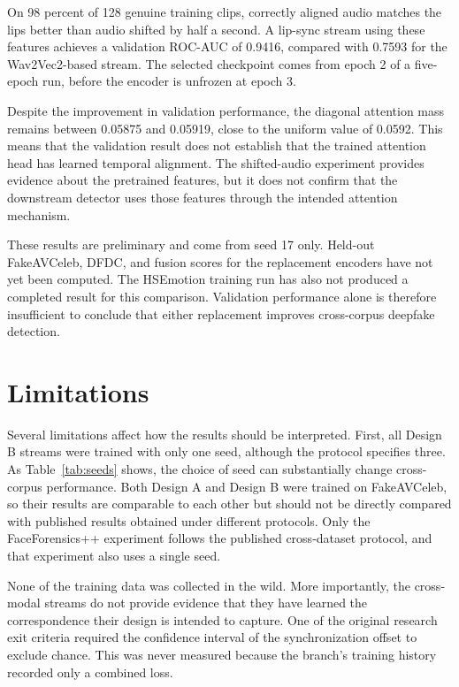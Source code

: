 \documentclass[conference]{IEEEtran}
\begin{document}
On 98 percent of 128 genuine training clips, correctly aligned audio matches
the lips better than audio shifted by half a second. A lip-sync stream using
these features achieves a validation ROC-AUC of 0.9416, compared with
0.7593 for the Wav2Vec2-based stream. The selected checkpoint comes from
epoch 2 of a five-epoch run, before the encoder is unfrozen at epoch 3.

Despite the improvement in validation performance, the diagonal attention
mass remains between 0.05875 and 0.05919, close to the uniform value of
0.0592. This means that the validation result does not establish that the
trained attention head has learned temporal alignment. The shifted-audio
experiment provides evidence about the pretrained features, but it does not
confirm that the downstream detector uses those features through the intended
attention mechanism.

These results are preliminary and come from seed 17 only. Held-out
FakeAVCeleb, DFDC, and fusion scores for the replacement encoders have not
yet been computed. The HSEmotion training run has also not produced a
completed result for this comparison. Validation performance alone is
therefore insufficient to conclude that either replacement improves
cross-corpus deepfake detection.

\section{Limitations}

Several limitations affect how the results should be interpreted. First,
all Design B streams were trained with only one seed, although the protocol
specifies three. As Table~\ref{tab:seeds} shows, the choice of seed can
substantially change cross-corpus performance. Both Design A and Design B
were trained on FakeAVCeleb, so their results are comparable to each other
but should not be directly compared with published results obtained under
different protocols. Only the FaceForensics++ experiment follows the
published cross-dataset protocol, and that experiment also uses a single
seed.

None of the training data was collected in the wild. More importantly, the
cross-modal streams do not provide evidence that they have learned the
correspondence their design is intended to capture. One of the original
research exit criteria required the confidence interval of the synchronization
offset to exclude chance. This was never measured because the branch's
training history recorded only a combined loss.
\end{document}
